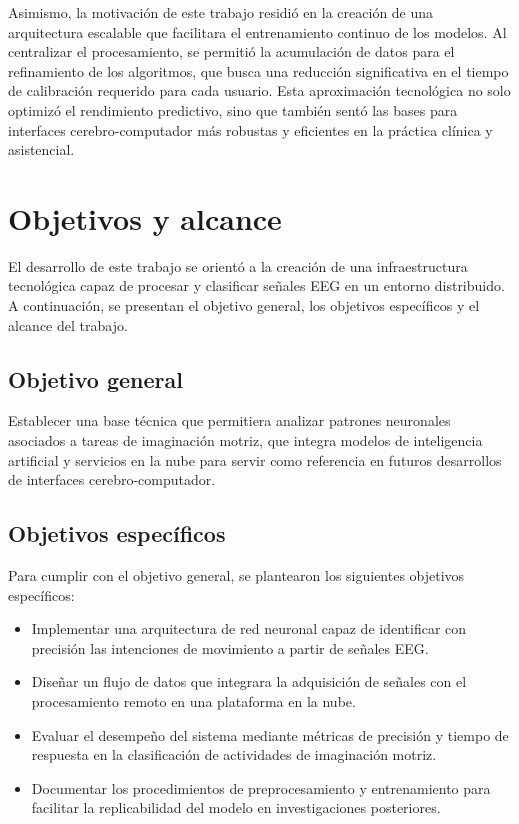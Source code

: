 Asimismo, la motivación de este trabajo residió en la creación de una arquitectura escalable que facilitara el entrenamiento continuo de los modelos. Al centralizar el procesamiento, se permitió la acumulación de datos para el refinamiento de los algoritmos, que busca una reducción significativa en el tiempo de calibración requerido para cada usuario. Esta aproximación tecnológica no solo optimizó el rendimiento predictivo, sino que también sentó las bases para interfaces cerebro-computador más robustas y eficientes en la práctica clínica y asistencial.


\section{Objetivos y alcance}

El desarrollo de este trabajo se orientó a la creación de una infraestructura tecnológica capaz de procesar y clasificar señales EEG en un entorno distribuido. A continuación, se presentan el objetivo general, los objetivos específicos y el alcance del trabajo.

\subsection{Objetivo general}

Establecer una base técnica que permitiera analizar patrones neuronales asociados a tareas de imaginación motriz, que integra modelos de inteligencia artificial y servicios en la nube para servir como referencia en futuros desarrollos de interfaces cerebro-computador.

\subsection{Objetivos específicos}
\label{subsec:configurando}

Para cumplir con el objetivo general, se plantearon los siguientes objetivos específicos:


\begin{itemize}
	\item Implementar una arquitectura de red neuronal capaz de identificar con precisión las intenciones de movimiento a partir de señales EEG.
	\item Diseñar un flujo de datos que integrara la adquisición de señales con el procesamiento remoto en una plataforma en la nube.
	\item Evaluar el desempeño del sistema mediante métricas de precisión y tiempo de respuesta en la clasificación de actividades de imaginación motriz.
	\item Documentar los procedimientos de preprocesamiento y entrenamiento para facilitar la replicabilidad del modelo en investigaciones posteriores.
\end{itemize}

